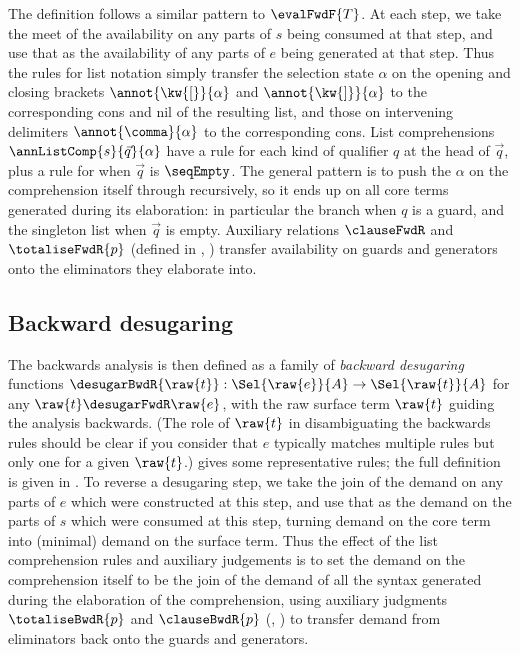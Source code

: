 The definition follows a similar pattern to $\evalFwdF{T}$. At each step, we take the meet of the availability on any parts of $s$ being consumed at that step, and use that as the availability of any parts of $e$ being generated at that step. Thus the rules for list notation simply transfer the selection state $\alpha$ on the opening and closing brackets $\annot{\kw{[}}{\alpha}$ and $\annot{\kw{]}}{\alpha}$ to the corresponding cons and nil of the resulting list, and those on intervening delimiters $\annot{\comma}{\alpha}$ to the corresponding cons. List comprehensions $\annListComp{s}{\vec{q}}{\alpha}$ have a rule for each kind of qualifier $q$ at the head of $\vec{q}$, plus a rule for when $\vec{q}$ is $\seqEmpty$. The general pattern is to push the $\alpha$ on the comprehension itself through recursively, so it ends up on all core terms generated during its elaboration: in particular the  branch when $q$ is a guard, and the singleton list when $\vec{q}$ is empty. Auxiliary relations $\clauseFwdR$ and $\totaliseFwdR{p}$ (\ifappendices defined in , \else \IncludedWithSupplementaryMaterial\fi) transfer availability on guards and generators onto the eliminators they elaborate into.

\subsection{Backward desugaring}

The backwards analysis is then defined as a family of \textit{backward desugaring} functions $\desugarBwdR{\raw{t}}: \Sel{\raw{e}}{A} \to \Sel{\raw{t}}{A}$ for any $\raw{t} \desugarFwdR \raw{e}$, with the raw surface term $\raw{t}$ guiding the analysis backwards. (The role of $\raw{t}$ in disambiguating the backwards rules should be clear if you consider that $e$ typically matches multiple rules but only one for a given $\raw{t}$.)  gives some representative rules; the full definition is {\ifappendices given in  \else \IncludedWithSupplementaryMaterial.\fi} To reverse a desugaring step, we take the join of the demand on any parts of $e$ which were constructed at this step, and use that as the demand on the parts of $s$ which were consumed at this step, turning demand on the core term into (minimal) demand on the surface term. Thus the effect of the list comprehension rules and auxiliary judgements is to set the demand on the comprehension itself to be the join of the demand of all the syntax generated during the elaboration of the comprehension, using auxiliary judgments $\totaliseBwdR{p}$ and $\clauseBwdR{p}$ \ifappendices (, ) \fi to transfer demand from eliminators back onto the guards and generators.

